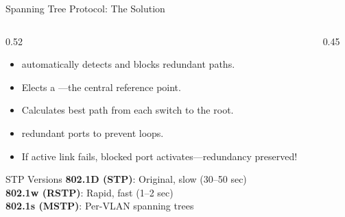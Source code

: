 \documentclass[aspectratio=169]{beamer}  %
\begin{document}
\begin{frame}{Spanning Tree Protocol: The Solution}
    \begin{columns}[T]
        \begin{column}{0.52\textwidth}
            \begin{itemize}
                \item {} automatically detects and blocks redundant paths.
                \item Elects a ---the central reference point.
                \item Calculates best path from each switch to the root.
                \item {} redundant ports to prevent loops.
                \item If active link fails, blocked port activates---redundancy preserved!
            \end{itemize}
            
            \vspace{0.3em}
            \begin{block}{STP Versions}
                \small
                \textbf{802.1D (STP)}: Original, slow (30--50 sec) \\
                \textbf{802.1w (RSTP)}: Rapid, fast (1--2 sec) \\
                \textbf{802.1s (MSTP)}: Per-VLAN spanning trees
            \end{block}
        \end{column}
        \begin{column}{0.45\textwidth}
            \begin{center}
\end{center}
\end{column}
\end{columns}
\end{frame}
\end{document}
